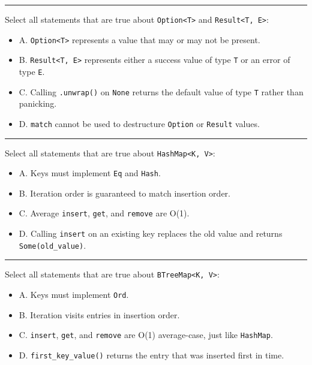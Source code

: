 \documentclass[
  11pt,
]{article}
\providecommand{\tightlist}{%
  \setlength{\itemsep}{0pt}\setlength{\parskip}{0pt}}
\begin{document}
\begin{center}\rule{0.5\linewidth}{0.5pt}\end{center}

Select all statements that are true about
\texttt{Option\textless{}T\textgreater{}} and
\texttt{Result\textless{}T,\ E\textgreater{}}:

\begin{itemize}
\tightlist
\item[$\square$]
  A. \texttt{Option\textless{}T\textgreater{}} represents a value that
  may or may not be present.
\item[$\square$]
  B. \texttt{Result\textless{}T,\ E\textgreater{}} represents either a
  success value of type \texttt{T} or an error of type \texttt{E}.
\item[$\square$]
  C. Calling \texttt{.unwrap()} on \texttt{None} returns the default
  value of type \texttt{T} rather than panicking.
\item[$\square$]
  D. \texttt{match} cannot be used to destructure \texttt{Option} or
  \texttt{Result} values.
\end{itemize}

\begin{center}\rule{0.5\linewidth}{0.5pt}\end{center}

Select all statements that are true about
\texttt{HashMap\textless{}K,\ V\textgreater{}}:

\begin{itemize}
\tightlist
\item[$\square$]
  A. Keys must implement \texttt{Eq} and \texttt{Hash}.
\item[$\square$]
  B. Iteration order is guaranteed to match insertion order.
\item[$\square$]
  C. Average \texttt{insert}, \texttt{get}, and \texttt{remove} are
  O(1).
\item[$\square$]
  D. Calling \texttt{insert} on an existing key replaces the old value
  and returns \texttt{Some(old\_value)}.
\end{itemize}

\begin{center}\rule{0.5\linewidth}{0.5pt}\end{center}

Select all statements that are true about
\texttt{BTreeMap\textless{}K,\ V\textgreater{}}:

\begin{itemize}
\tightlist
\item[$\square$]
  A. Keys must implement \texttt{Ord}.
\item[$\square$]
  B. Iteration visits entries in insertion order.
\item[$\square$]
  C. \texttt{insert}, \texttt{get}, and \texttt{remove} are O(1)
  average-case, just like \texttt{HashMap}.
\item[$\square$]
  D. \texttt{first\_key\_value()} returns the entry that was inserted
  first in time.
\end{itemize}
\end{document}
